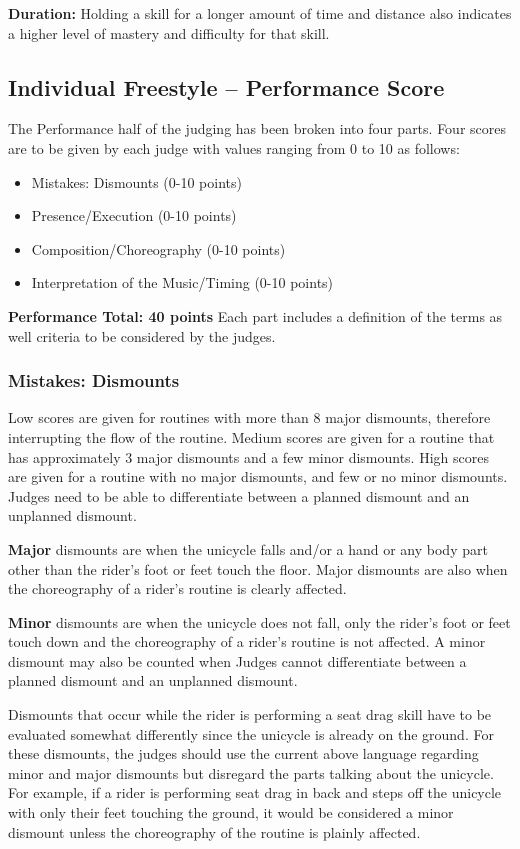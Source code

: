 \textbf{Duration:} Holding a skill for a longer amount of time and distance also indicates a higher level of mastery and difficulty for that skill.

\subsection{Individual Freestyle -- Performance Score \label{sec:freestyle_individual-performance-score}}

The Performance half of the judging has been broken into four parts.
Four scores are to be given by each judge with values ranging from 0 to 10 as follows:
\begin{itemize}
\item Mistakes: Dismounts (0-10 points) 
\item Presence/Execution (0-10 points)
\item Composition/Choreography (0-10 points)
\item Interpretation of the Music/Timing (0-10 points)
\end{itemize}
\textbf{Performance Total: 40 points}
Each part includes a definition of the terms as well criteria to be considered by the judges.

\subsubsection{Mistakes: Dismounts}

Low scores are given for routines with more than 8 major dismounts, therefore interrupting the flow of the routine.
Medium scores are given for a routine that has approximately 3 major dismounts and a few minor dismounts.
High scores are given for a routine with no major dismounts, and few or no minor dismounts.
Judges need to be able to differentiate between a planned dismount and an unplanned dismount.

\textbf{Major} dismounts are when the unicycle falls and/or a hand or any body part other than the rider's foot or feet touch the floor.
Major dismounts are also when the choreography of a rider's routine is clearly affected.

\textbf{Minor} dismounts are when the unicycle does not fall, only the rider's foot or feet touch down and the choreography of a rider's routine is not affected.
A minor dismount may also be counted when Judges cannot differentiate between a planned dismount and an unplanned dismount.

Dismounts that occur while the rider is performing a seat drag skill have to be evaluated somewhat differently since the unicycle is already on the ground.
For these dismounts, the judges should use the current above language regarding minor and major dismounts but disregard the parts talking about the unicycle.
For example, if a rider is performing seat drag in back and steps off the unicycle with only their feet touching the ground, it would be considered a minor dismount unless the choreography of the routine is plainly affected.

